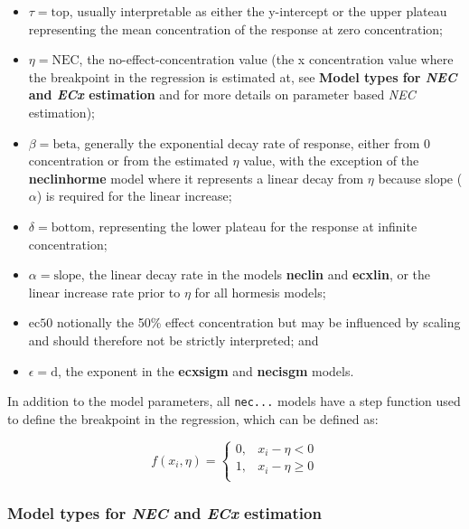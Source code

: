 \documentclass[
]{jss}
\begin{document}
\begin{itemize}
\item
  \(\tau = \text{top}\), usually interpretable as either the y-intercept
  or the upper plateau representing the mean concentration of the
  response at zero concentration;
\item
  \(\eta = \text{NEC}\), the no-effect-concentration value (the x
  concentration value where the breakpoint in the regression is
  estimated at, see \textbf{Model types for \emph{NEC} and \emph{ECx}
  estimation} and \citep{Fox2010} for more details on parameter based
  \emph{NEC} estimation);
\item
  \(\beta = \text{beta}\), generally the exponential decay rate of
  response, either from 0 concentration or from the estimated \(\eta\)
  value, with the exception of the \textbf{neclinhorme} model where it
  represents a linear decay from \(\eta\) because slope (\(\alpha\)) is
  required for the linear increase;
\item
  \(\delta = \text{bottom}\), representing the lower plateau for the
  response at infinite concentration;
\item
  \(\alpha = \text{slope}\), the linear decay rate in the models
  \textbf{neclin} and \textbf{ecxlin}, or the linear increase rate prior
  to \(\eta\) for all hormesis models;
\item
  \(\text{ec50}\) notionally the 50\% effect concentration but may be
  influenced by scaling and should therefore not be strictly
  interpreted; and
\item
  \(\epsilon = \text{d}\), the exponent in the \textbf{ecxsigm} and
  \textbf{necisgm} models.
\end{itemize}

In addition to the model parameters, all \texttt{nec...} models have a
step function used to define the breakpoint in the regression, which can
be defined as:

\[
f(x_i, \eta) = \begin{cases} 
      0, & x_i - \eta < 0 \\
      1, & x_i - \eta \geq 0 \\
   \end{cases}
\]

\hypertarget{model-types-for-nec-and-ecx-estimation}{%
\subsubsection{\texorpdfstring{Model types for \emph{NEC} and \emph{ECx}
estimation}{Model types for NEC and ECx estimation}}\label{model-types-for-nec-and-ecx-estimation}}
\end{document}
